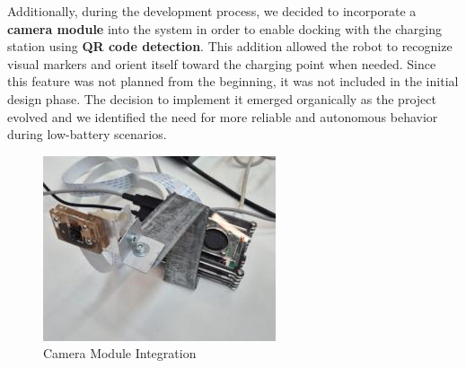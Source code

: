 Additionally, during the development process, we decided to incorporate a \textbf{camera module} into the system in order to enable docking with the charging station using \textbf{QR code detection}. This addition allowed the robot to recognize visual markers and orient itself toward the charging point when needed. Since this feature was not planned from the beginning, it was not included in the initial design phase. The decision to implement it emerged organically as the project evolved and we identified the need for more reliable and autonomous behavior during low-battery scenarios.

\begin{figure}[H]
    \centering
    \includegraphics[width=0.6\linewidth]{../ReportMovementModule/images/Aspose.Words.728084da-df58-4b9d-a372-f65cffbdb23d.017.png}
    \caption{Camera Module Integration}
\end{figure}
